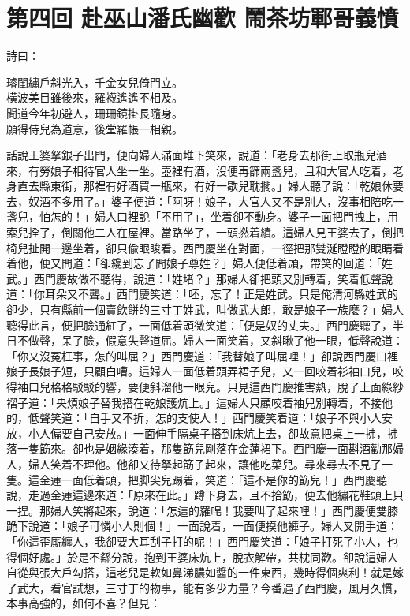 
\chapter*{第四回 赴巫山潘氏幽歡 鬧茶坊鄆哥義憤}


詩曰：

\begin{myquote} 
璿閨繡戶斜光入，千金女兒倚門立。\\橫波美目雖後來，羅襪遙遙不相及。\\聞道今年初避人，珊珊鏡掛長隨身。\\願得侍兒為道意，後堂羅帳一相親。
\end{myquote} 

話說王婆拏銀子出門，便向婦人滿面堆下笑來，說道：「老身去那街上取瓶兒酒來，有勞娘子相待官人坐一坐。壺裡有酒，沒便再篩兩盞兒，且和大官人吃着，老身直去縣東街，那裡有好酒買一瓶來，有好一歇兒耽擱。」{}婦人聽了說：「乾娘休要去，奴酒不多用了。」{}婆子便道：「阿呀！娘子，大官人又不是別人，{}沒事相陪吃一盞兒，怕怎的！」婦人口裡說「不用了」，坐着卻不動身。婆子一面把門拽上，用索兒拴了，倒關他二人在屋裡。當路坐了，一頭撚着績。這婦人見王婆去了，倒把椅兒扯開一邊坐着，{}卻只偸眼睃看。{}西門慶坐在對面，一徑把那雙涎瞪瞪的眼睛看着他，便又問道：「卻纔到忘了問娘子尊姓？」婦人便低着頭，帶笑的回道：「姓武。」西門慶故做不聽得，說道：「姓堵？」那婦人卻把頭又別轉着，笑着低聲說道：「你耳朵又不聾。」西門慶笑道：「呸，忘了！正是姓武。只是俺清河縣姓武的卻少，只有縣前一個賣飲餅的三寸丁姓武，叫做武大郎，敢是娘子一族麼？」{}婦人聽得此言，便把臉通紅了，一面低着頭微笑道：「便是奴的丈夫。」西門慶聽了，半日不做聲，呆了臉，假意失聲道屈。婦人一面笑着，又斜瞅了他一眼，{}低聲說道：「你又沒冤枉事，怎的叫屈？」西門慶道：「我替娘子叫屈哩！」卻說西門慶口裡娘子長娘子短，只顧白嘈。這婦人一面低着頭弄裙子兒，又一回咬着衫袖口兒，咬得袖口兒格格駁駁的響，要便斜溜他一眼兒。{}只見這西門慶推害熱，脫了上面綠紗褶子道：「央煩娘子替我搭在乾娘護炕上。」這婦人只顧咬着袖兒別轉着，不接他的，低聲笑道：「自手又不折，怎的支使人！」{}西門慶笑着道：「娘子不與小人安放，小人偏要自己安放。」一面伸手隔桌子搭到床炕上去，卻故意把桌上一拂，拂落一隻筯來。卻也是姻緣湊着，那隻筯兒剛落在金蓮裙下。西門慶一面斟酒勸那婦人，婦人笑着不理他。他卻又待拏起筯子起來，讓他吃菜兒。尋來尋去不見了一隻。這金蓮一面低着頭，把脚尖兒踢着，笑道：「這不是你的筯兒！」西門慶聽說，走過金蓮這邊來道：「原來在此。」蹲下身去，且不拾筯，便去他繡花鞋頭上只一捏。那婦人笑將起來，說道：「怎這的羅唣！我要叫了起來哩！」西門慶便雙膝跪下說道：「娘子可憐小人則個！」一面說着，一面便摸他褲子。婦人叉開手道：「你這歪厮纏人，我卻要大耳刮子打的呢！」西門慶笑道：「娘子打死了小人，也得個好處。」於是不繇分說，抱到王婆床炕上，脫衣解帶，共枕同歡。卻說這婦人自從與張大戶勾搭，這老兒是軟如鼻涕膿如醬的一件東西，幾時得個爽利！就是嫁了武大，看官試想，三寸丁的物事，能有多少力量？今番遇了西門慶，風月久慣，本事高強的，如何不喜？但見：

